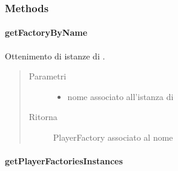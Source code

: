 \documentclass[letterpaper,10pt,italian,openany,oneside]{sphinxmanual}
\begin{document}
\subsubsection{Methods}
\label{\detokenize{source/it/unicam/cs/pa/mastermind/players/PlayerFactoryRegistry:methods}}

\paragraph{getFactoryByName}
\label{\detokenize{source/it/unicam/cs/pa/mastermind/players/PlayerFactoryRegistry:getfactorybyname}}

\begin{fulllineitems}
\label{\detokenize{source/it/unicam/cs/pa/mastermind/players/PlayerFactoryRegistry:it.unicam.cs.pa.mastermind.players.PlayerFactoryRegistry.getFactoryByName(String)}}
Ottenimento di istanze di .
\begin{quote}\begin{description}
\item[{Parametri}] \leavevmode\begin{itemize}
\item {} 
 \textendash{} nome associato all’istanza di 

\end{itemize}

\item[{Ritorna}] \leavevmode
PlayerFactory associato al nome

\end{description}\end{quote}

\end{fulllineitems}



\paragraph{getPlayerFactoriesInstances}
\label{\detokenize{source/it/unicam/cs/pa/mastermind/players/PlayerFactoryRegistry:getplayerfactoriesinstances}}
\end{document}
